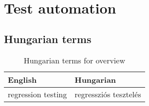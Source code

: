 \chapter{Test automation}



\section{Hungarian terms}

\begin{table}
    \centering
    \small
    \caption{Hungarian terms for overview}
    \begin{tabular}{ll}
        \toprule
        \textbf{English} & \textbf{Hungarian} \\
        \midrule
        regression testing & regressziós tesztelés \\
        \bottomrule
        \end{tabular}
        \label{tab:overview:hungarian-terms-test-automation}
\end{table} 